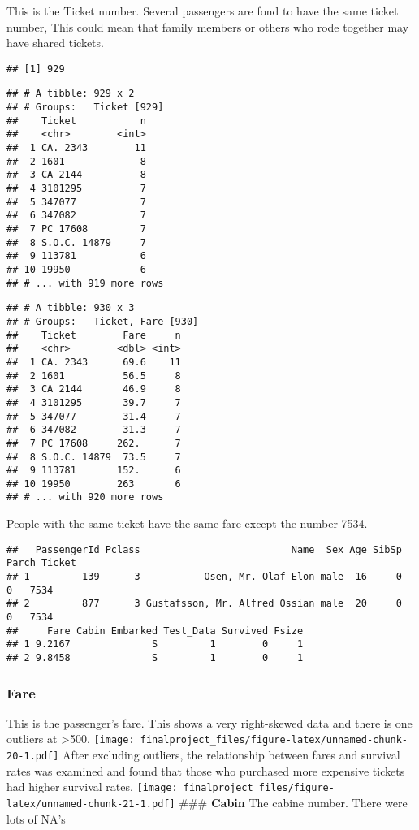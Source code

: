 \documentclass[
]{article}
\begin{document}
This is the Ticket number. Several passengers are fond to have the same
ticket number, This could mean that family members or others who rode
together may have shared tickets.

\begin{verbatim}
## [1] 929
\end{verbatim}

\begin{verbatim}
## # A tibble: 929 x 2
## # Groups:   Ticket [929]
##    Ticket           n
##    <chr>        <int>
##  1 CA. 2343        11
##  2 1601             8
##  3 CA 2144          8
##  4 3101295          7
##  5 347077           7
##  6 347082           7
##  7 PC 17608         7
##  8 S.O.C. 14879     7
##  9 113781           6
## 10 19950            6
## # ... with 919 more rows
\end{verbatim}

\begin{verbatim}
## # A tibble: 930 x 3
## # Groups:   Ticket, Fare [930]
##    Ticket        Fare     n
##    <chr>        <dbl> <int>
##  1 CA. 2343      69.6    11
##  2 1601          56.5     8
##  3 CA 2144       46.9     8
##  4 3101295       39.7     7
##  5 347077        31.4     7
##  6 347082        31.3     7
##  7 PC 17608     262.      7
##  8 S.O.C. 14879  73.5     7
##  9 113781       152.      6
## 10 19950        263       6
## # ... with 920 more rows
\end{verbatim}

People with the same ticket have the same fare except the number 7534.

\begin{verbatim}
##   PassengerId Pclass                          Name  Sex Age SibSp Parch Ticket
## 1         139      3           Osen, Mr. Olaf Elon male  16     0     0   7534
## 2         877      3 Gustafsson, Mr. Alfred Ossian male  20     0     0   7534
##     Fare Cabin Embarked Test_Data Survived Fsize
## 1 9.2167              S         1        0     1
## 2 9.8458              S         1        0     1
\end{verbatim}

\hypertarget{fare}{%
\subsubsection{\texorpdfstring{\textbf{Fare}}{Fare}}\label{fare}}

This is the passenger's fare. This shows a very right-skewed data and
there is one outliers at \textgreater500.
\texttt{[image: finalproject\_files/figure-latex/unnamed-chunk-20-1.pdf]}
After excluding outliers, the relationship between fares and survival
rates was examined and found that those who purchased more expensive
tickets had higher survival rates.
\texttt{[image: finalproject\_files/figure-latex/unnamed-chunk-21-1.pdf]}
\#\#\# \textbf{Cabin} The cabine number. There were lots of NA's
\end{document}
